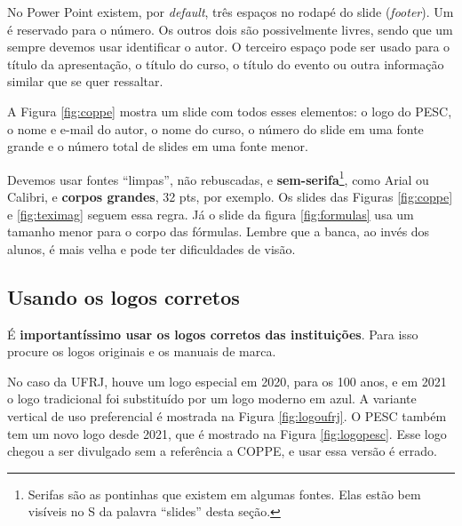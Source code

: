No Power Point existem, por \textit{default}, três espaços no rodapé do slide (\textit{footer}). Um é reservado para o número. Os outros dois são possivelmente livres, sendo que um  sempre devemos usar identificar o autor. O terceiro espaço pode ser usado para o título da apresentação, o título do curso, o título do evento ou outra informação similar que se quer ressaltar.

A Figura \ref{fig:coppe} mostra um slide com todos esses elementos: o logo do PESC, o nome e e-mail do autor, o nome do curso, o número do slide em uma fonte grande e o número total de slides em uma fonte menor.



Devemos usar fontes ``limpas'', não rebuscadas, e \textbf{sem-serifa}\footnote{Serifas são as pontinhas que existem em algumas fontes. Elas estão bem visíveis no S da palavra ``slides'' desta seção.}, como Arial ou Calibri, e \textbf{corpos grandes}, 32 pts, por exemplo. Os slides das Figuras \ref{fig:coppe} e \ref{fig:teximag} seguem essa regra. Já o slide da figura \ref{fig:formulas} usa um tamanho menor para o corpo das fórmulas. Lembre que a banca, ao invés dos alunos, é mais velha e pode ter dificuldades de visão.





\subsection{Usando os logos corretos}

É \textbf{importantíssimo usar os logos corretos das instituições}. Para isso procure os logos originais e os manuais de marca.

No caso da UFRJ, houve um logo especial em 2020, para os 100 anos, e em 2021 o logo tradicional foi substituído por um logo moderno em azul. A variante vertical de uso preferencial é mostrada na Figura \ref{fig:logoufrj}. O PESC também tem um novo logo desde 2021, que é mostrado na Figura \ref{fig:logopesc}. Esse logo chegou a ser divulgado sem a referência a COPPE, e usar essa versão é errado.

